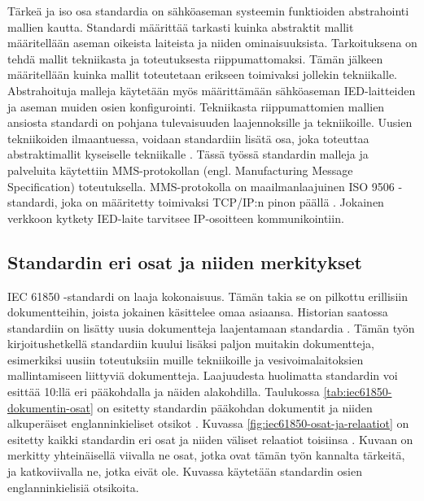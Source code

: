Tärkeä ja iso osa standardia on sähköaseman systeemin funktioiden abstrahointi mallien kautta. Standardi määrittää tarkasti kuinka abstraktit mallit määritellään aseman oikeista laiteista ja niiden ominaisuuksista. Tarkoituksena on tehdä mallit tekniikasta ja toteutuksesta riippumattomaksi. Tämän jälkeen määritellään kuinka mallit toteutetaan erikseen toimivaksi jollekin tekniikalle. Abstrahoituja malleja käytetään myös määrittämään sähköaseman IED-laitteiden ja aseman muiden osien konfigurointi. Tekniikasta riippumattomien mallien ansiosta standardi on pohjana tulevaisuuden laajennoksille ja tekniikoille. Uusien tekniikoiden ilmaantuessa, voidaan standardiin lisätä  osa, joka  toteuttaa abstraktimallit kyseiselle tekniikalle \cite[s.~2]{Brunner2008}. Tässä työssä standardin malleja ja palveluita käytettiin MMS-protokollan (engl. Manufacturing Message Specification) toteutuksella. MMS-protokolla on maailmanlaajuinen ISO 9506 -standardi, joka on määritetty toimivaksi TCP/IP:n pinon päällä \cite{MMS-protocol-stack-and-API}. Jokainen verkkoon kytkety IED-laite tarvitsee IP-osoitteen kommunikointiin.


\subsection{Standardin eri osat ja niiden merkitykset}	
IEC 61850 -standardi on laaja kokonaisuus. Tämän takia se on pilkottu erillisiin dokumentteihin, joista jokainen käsittelee omaa asiaansa. Historian saatossa standardiin on lisätty uusia dokumentteja laajentamaan standardia \cite{IEC61850series, New-documents-by-IEC-TC-57} \cite[s.~13]{IEC61850-1}. Tämän työn kirjoitushetkellä standardiin kuului lisäksi paljon muitakin dokumentteja, esimerkiksi uusiin toteutuksiin muille tekniikoille ja vesivoimalaitoksien mallintamiseen liittyviä dokumentteja. Laajuudesta huolimatta standardin voi esittää 10:llä eri pääkohdalla ja näiden alakohdilla. Taulukossa \ref{tab:iec61850-dokumentin-osat} on esitetty standardin pääkohdan dokumentit ja niiden alkuperäiset englanninkieliset otsikot \cite[s.~2]{Mackiewicz2006} \cite{IEC61850series}. Kuvassa \ref{fig:iec61850-osat-ja-relaatiot} on esitetty kaikki standardin eri osat ja niiden väliset relaatiot toisiinsa \cite[s.~14]{IEC61850-7-1} \cite[s.~22]{IEC61850-1}. Kuvaan on merkitty yhteinäisellä viivalla ne osat, jotka ovat tämän työn kannalta tärkeitä, ja katkoviivalla ne, jotka eivät ole. Kuvassa käytetään standardin osien englanninkielisiä otsikoita.

